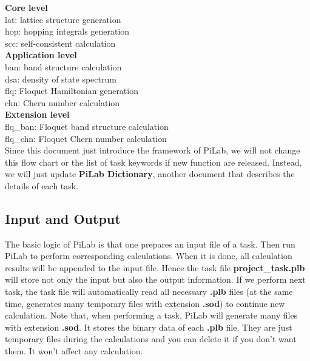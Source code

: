 \documentclass[10pt,a4paper]{article}
\begin{document}
\textbf{Core level } \\

lat: lattice structure generation\\

hop: hopping integrals generation\\

scc: self-consistent calculation\\

\textbf{Application level } \\

ban: band structure calculation\\

dsa: density of state spectrum\\

flq: Floquet Hamiltonian generation \\

chn: Chern number calculation \\

\textbf{Extension level } \\

flq\_ban: Floquet band structure calculation \\

flq\_chn: Floquet Chern number calculation \\

Since this document just introduce the framework of PiLab, we will not change this flow chart or the list of task keywords if new function are released. Instead, we will just update \textbf{PiLab Dictionary}, another document that describes the details of each task. 

\subsection{Input and Output}
The basic logic of PiLab is that one prepares an input file of a task. Then run PiLab to perform corresponding calculations. When it is done, all calculation results will be appended to the input file. Hence the task file \textbf{project\_task.plb} will store not only the input but also the output information. If we perform next task, the task file will automatically read all necessary \textbf{.plb} files (at the same time, generates many temporary files with extension \textbf{.sod}) to continue new calculation. Note that, when performing a task, PiLab will generate many files with extension \textbf{.sod}. It stores the binary data of each \textbf{.plb} file. They are just temporary files during the calculations and you can delete it if you don't want them. It won't affect any calculation.   
\end{document}
